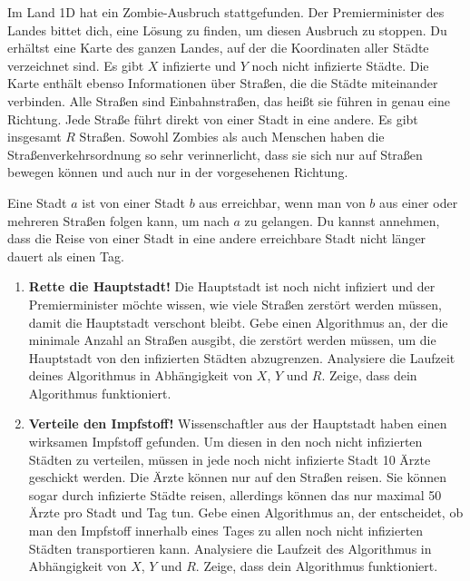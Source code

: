 \documentclass{uebung_cs}
\begin{document}
\begin{exercise}
    Im Land 1D hat ein Zombie-Ausbruch stattgefunden. Der Premierminister des Landes bittet dich, eine Lösung zu finden, um diesen Ausbruch zu stoppen. Du erhältst eine Karte des ganzen Landes, auf der die Koordinaten aller Städte verzeichnet sind. Es gibt $X$ infizierte und $Y$ noch nicht infizierte Städte. Die Karte enthält ebenso Informationen über Straßen, die die Städte miteinander verbinden. Alle Straßen sind Einbahnstraßen, das heißt sie führen in genau eine Richtung. Jede Straße führt direkt von einer Stadt in eine andere. Es gibt insgesamt $R$ Straßen. Sowohl Zombies als auch Menschen haben die Straßenverkehrsordnung so sehr verinnerlicht, dass sie sich nur auf Straßen bewegen können und auch nur in der vorgesehenen Richtung.
 
    Eine Stadt $a$ ist von einer Stadt $b$ aus erreichbar, wenn man von $b$ aus einer oder mehreren Straßen folgen kann, um nach $a$ zu gelangen. Du kannst annehmen, dass die Reise von einer Stadt in eine andere erreichbare Stadt nicht länger dauert als einen Tag.
    \begin{enumerate}
        \item \textbf{Rette die Hauptstadt!} Die Hauptstadt ist noch nicht infiziert und der Premierminister möchte wissen, wie viele Straßen zerstört werden müssen, damit die Hauptstadt verschont bleibt. Gebe einen Algorithmus an, der die minimale Anzahl an Straßen ausgibt, die zerstört werden müssen, um die Hauptstadt von den infizierten Städten abzugrenzen. Analysiere die Laufzeit deines Algorithmus in Abhängigkeit von $X$, $Y$ und $R$. Zeige, dass dein Algorithmus funktioniert.
        \item \textbf{Verteile den Impfstoff!} Wissenschaftler aus der Hauptstadt haben einen wirksamen Impfstoff gefunden. Um diesen in den noch nicht infizierten Städten zu verteilen, müssen in jede noch nicht infizierte Stadt 10 Ärzte geschickt werden. Die Ärzte können nur auf den Straßen reisen. Sie können sogar durch infizierte Städte reisen, allerdings können das nur maximal 50 Ärzte pro Stadt und Tag tun. Gebe einen Algorithmus an, der entscheidet, ob man den Impfstoff innerhalb eines Tages zu allen noch nicht infizierten Städten transportieren kann. Analysiere die Laufzeit des Algorithmus in Abhängigkeit von $X$, $Y$ und $R$. Zeige, dass dein Algorithmus funktioniert.
    \end{enumerate}
\end{exercise}
\end{document}
